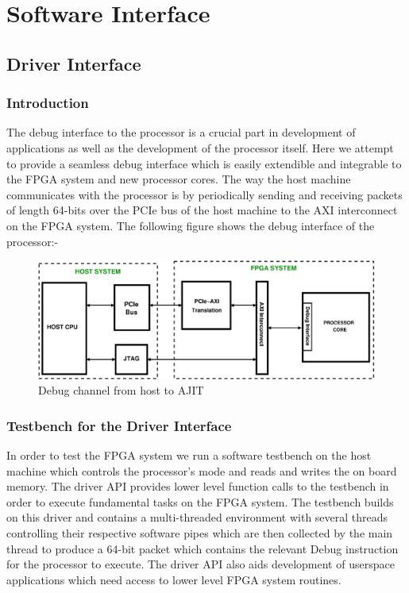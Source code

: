 \chapter{Software Interface}

\section{Driver Interface}
\subsection{Introduction}
The debug interface to the processor is a crucial part in development of applications as well as the development of the processor itself.
Here we attempt to provide a seamless debug interface which is easily extendible and integrable to the FPGA system and new processor cores.
The way the host machine communicates with the processor is by periodically sending and receiving packets of length 64-bits over the PCIe
bus of the host machine to the AXI interconnect on the FPGA system. The following figure shows the debug interface of the processor:-

\begin{figure}[H]
\centering
\includegraphics[width=\textwidth]{eps_pdf_sources/ajit_fpga/Debug_Interface/debug_channel_intro}
\caption{Debug channel from host to AJIT}
\end{figure}

\subsection{Testbench for the Driver Interface}
In order to test the FPGA system we run a software testbench on the host machine which controls the processor's mode and reads and writes
the on board memory. The driver API provides lower level function calls to the testbench in order to execute fundamental tasks on the FPGA system.
The testbench builds on this driver and contains a multi-threaded environment with several threads controlling their respective software
pipes which are then collected by the main thread to produce a 64-bit packet which contains the relevant Debug instruction for the processor
to execute. The driver API also aids development of userspace applications which need access to lower level FPGA system routines.

